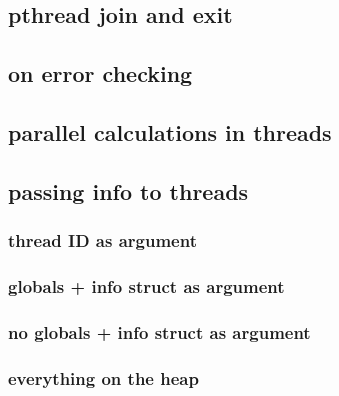 \subsection{pthread join and exit}



\subsection{on error checking}



\subsection{parallel calculations in threads}







\subsection{passing info to threads}

\subsubsection{thread ID as argument}


\subsubsection{globals + info struct as argument}



\subsubsection{no globals + info struct as argument}



\subsubsection{everything on the heap}



